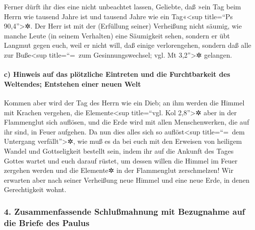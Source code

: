  Ferner dürft ihr dies eine nicht unbeachtet lassen,
Geliebte, daß »ein Tag beim Herrn wie tausend Jahre ist und tausend
Jahre wie ein Tag«\textless sup title=``Ps 90,4''\textgreater✲.
 Der Herr ist mit der (Erfüllung seiner) Verheißung nicht
säumig, wie manche Leute (in seinem Verhalten) eine Säumigkeit sehen,
sondern er übt Langmut gegen euch, weil er nicht will, daß einige
verlorengehen, sondern daß alle zur Buße\textless sup title=``=~zum
Gesinnungswechsel; vgl. Mt 3,2''\textgreater✲ gelangen.

\hypertarget{c-hinweis-auf-das-pluxf6tzliche-eintreten-und-die-furchtbarkeit-des-weltendes-entstehen-einer-neuen-welt}{%
\paragraph{c) Hinweis auf das plötzliche Eintreten und die Furchtbarkeit
des Weltendes; Entstehen einer neuen
Welt}\label{c-hinweis-auf-das-pluxf6tzliche-eintreten-und-die-furchtbarkeit-des-weltendes-entstehen-einer-neuen-welt}}

 Kommen aber wird der Tag des Herrn wie ein Dieb; an ihm
werden die Himmel mit Krachen vergehen, die Elemente\textless sup
title=``vgl. Kol 2,8''\textgreater✲ aber in der Flammenglut sich
auflösen, und die Erde wird mit allen Menschenwerken, die auf ihr sind,
in Feuer aufgehen.  Da nun dies alles sich so
auflöst\textless sup title=``=~dem Untergang verfällt''\textgreater✲,
wie muß es da bei euch mit den Erweisen von heiligem Wandel und
Gottseligkeit bestellt sein,  indem ihr auf die Ankunft
des Tages Gottes wartet und euch darauf rüstet, um dessen willen die
Himmel im Feuer zergehen werden und die Elemente✲ in der Flammenglut
zerschmelzen!  Wir erwarten aber nach seiner Verheißung
neue Himmel und eine neue Erde, in denen Gerechtigkeit wohnt.

\hypertarget{zusammenfassende-schluuxdfmahnung-mit-bezugnahme-auf-die-briefe-des-paulus}{%
\subsubsection{4. Zusammenfassende Schlußmahnung mit Bezugnahme auf die
Briefe des
Paulus}\label{zusammenfassende-schluuxdfmahnung-mit-bezugnahme-auf-die-briefe-des-paulus}}

